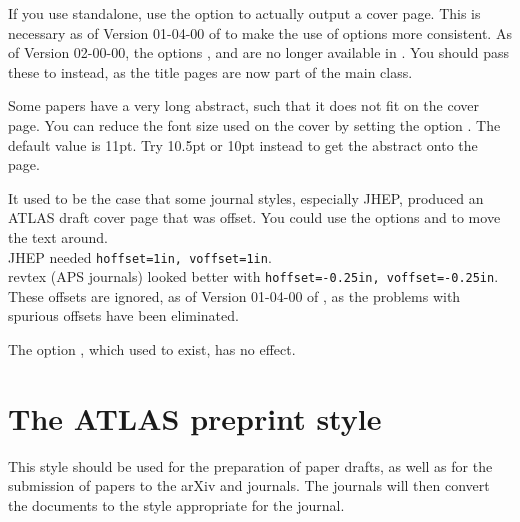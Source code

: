 If you use  standalone, use the option  to
actually output a cover page. 
This is necessary as of Version 01-04-00 of  to make the use of options more consistent.
As of Version 02-00-00, the options ,  and  are no longer available
in .
You should pass these to  instead, as the title pages are now part of the main class.

Some papers have a very long abstract, such that it does not fit on the cover page.
You can reduce the font size used on the cover by setting the option .
The default value is 11pt. Try 10.5pt or 10pt instead to get the abstract onto the page.

It used to be the case that some journal styles, especially JHEP,
produced an ATLAS draft cover page that was offset.
You could use the options  and  to move the text around.\\
JHEP needed \verb|hoffset=1in, voffset=1in|.\\
revtex (APS journals) looked better with  \verb|hoffset=-0.25in, voffset=-0.25in|.\\
These offsets are ignored, as of Version 01-04-00 of ,
as the problems with spurious offsets have been eliminated.

The option , which used to exist, has no effect.


\section{The ATLAS preprint style}
\label{sec:atlasstyle}

This style should be used for the preparation of paper drafts,
as well as for the submission of papers to the arXiv and journals.
The journals will then convert the documents to the style appropriate for the journal.

